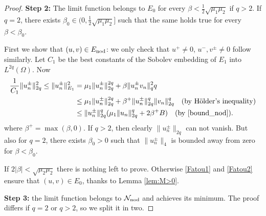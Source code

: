 \documentclass[reqno]{amsart}
\begin{document}
\begin{proof}
\noindent\textbf{Step 2:} The limit function belongs to $E_0$ for every
$\beta <\frac{1}{2}\sqrt{\mu_1\mu_2}$ if $q>2$.
If $q=2$, there exists $\beta_0\in (0,\frac{1}{2}\sqrt{\mu_1\mu_2}]$ such that the
same holds true  for every $\beta <\beta_0$.

First we  show that $(u,v)\in E_{\rm nod}$: we only check that
$u^+\neq 0$, $u^-,v^{\pm}\neq 0$ follow similarly.
Let $C_1$ be the best constants of the Sobolev embedding of $E_1$ into
$L^{2q}(\Omega)$.
 Now
\begin{align*}
 \frac{1}{C_1} \|u^{\pm}_n\|_{2q}^2 \le \|u^{\pm}_n\|_{E_1}^2
&=\mu_1 \|u^{\pm}_n\|_{2q}^{2q} + \beta \|u^{\pm}_nv_n\|_q^2q \\
&\leq  \mu_1 \|u^{\pm}_n\|_{2q}^{2q} + \beta^+ \|u^{\pm}_n\|_{2q}^q\|v_n\|_{2q}^q
 \quad\text{(by H\"older's inequality)} \\
&\leq \|u^{\pm}_n\|_{2q}^q (\mu_1 \|u_n\|_{2q}^q + 2\beta^+ B ) \quad
 \text{(by \eqref{bound_nod})}.
\end{align*}
where $\beta^+=\max(\beta,0)$.
If $q>2$, then clearly $\|u^{\pm}_n\|_{2q}$ can not vanish.
 But also for $q=2$,  there exists $\beta_0>0$ such that
$\|u^{\pm}_n\|_{4}$ is bounded away from zero for $\beta <\beta_0$.

If $2|\beta|<\sqrt{\mu_2\mu_2}$ there is nothing left to prove.
 Otherwise  \eqref{Fatou1} and \eqref{Fatou2} ensure that $(u,v)\in E_0$,
thanks to Lemma \ref{lem:M>0}.
\smallskip

\noindent\textbf{Step 3:} the limit function  belongs to
$\mathcal N_{\rm nod}$ and achieves its minimum.
The proof differs if $q=2$ or $q>2$, so we split it in two.
\smallskip


\end{proof}
\end{document}
